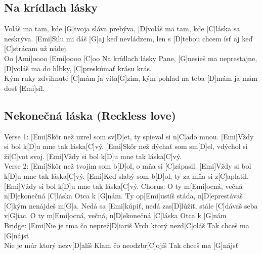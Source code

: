 \documentclass[10pt]{article}
\begin{document}
\begin{Large}
\begin{minipage}{\textwidth}
\subsection{Na krídlach lásky}
\begin{multicols}{2}
\begin{guitar}
	[Emi]Voláš ma tam, kde [G]tvoja sláva prebýva,
	[D]voláš ma tam, kde [C]láska sa neskrýva.
	[Emi]Silu mi dáš [G]aj keď nevládzem,
	len s [D]tebou chcem ísť 
	aj keď [C]strácam už nádej.
	\\
	[G]Oo  [Ami]oooo  [Emi]oooo  [C]oo
	\columnbreak
	[Emi]Na krídlach lásky Pane,
	[G]nesieš ma neprestajne,
	[D]voláš ma do hĺbky,
	[C]preskúmať krásu krás.
	\\
	[Emi]Kým ruky zdvihnuté [C]mám
	ja víťa[G]zím,
	kým pohľad na teba [D]mám
	ja mám dosť [Emi]síl.
\end{guitar}
\end{multicols}
\end{minipage}


\begin{minipage}{\textwidth}
\subsection{Nekonečná láska (Reckless love)}
\begin{multicols}{2}
\begin{guitar}
	Verse 1:
	[Emi]Skôr než uzrel som sv[D]et, 
	ty spieval si n[C]ado mnou.
	[Emi]Vždy si bol k[D]u mne tak láska[C]vý.
	[Emi]Skôr než dýchať som sm[D]el, 
	vdýchol si ži[C]vot svoj.
	[Emi]Vždy si bol k[D]u mne tak láska[C]vý.
	\\
	Verse 2:
	[Emi]Skôr než tvojim som b[D]ol, 
	o mňa si [C]zápasil.
	[Emi]Vždy si bol k[D]u mne tak láska[C]vý.
	[Emi]Keď slabý som b[D]ol, 
	ty za mňa si z[C]aplatil.
	[Emi]Vždy si bol k[D]u mne tak láska[C]vý.
	\columnbreak
	Chorus:
	O ty m[Emi]ocná, večná n[D]ekonečná 
	[C]láska Otca k [G]nám.
	Ty op[Emi]ustíš stáda, n[D]eprestávaš 
	[C]kým nenájdeš m[G]a.
	Nedá sa [Emi]kúpiť, nedá zas[D]lúžiť, 
	stále [C]dávaš seba v[G]iac.
	O ty m[Emi]ocná, večná, n[D]ekonečná 
	[C]láska Otca k [G]nám
	\\
	Bridge:
	[Emi]Nie je tma čo neprež[D]iariš
	Vrch ktorý nezd[C]oláš
	Tak chceš ma [G]nájsť
	\\
	[Emi]Nie je múr ktorý nezv[D]alíš
	Klam čo neodzbr[C]ojíš
	Tak chceš ma [G]nájsť
\end{guitar}
\end{multicols}
\end{minipage}


\end{Large}
\end{document}
